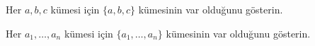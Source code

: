 \begin{prob}
Her $a,b,c$ kümesi için $\{a,b,c\}$ kümesinin var olduğunu gösterin.
\end{prob}

\begin{prob}
Her $a_1, \ldots, a_n$ kümesi için $\{a_1, \ldots, a_n\}$ kümesinin
var olduğunu gösterin.
\end{prob}


